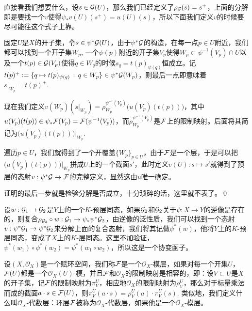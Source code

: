 	直接看我们想要什么，设$s\in \mathcal{G}(U)$，那么我们已经定义了$\rho_{\mathcal{G}}(s)=s^+$，上面的分解即是要找一个$v$使得$\psi_*v(U)(s^+)=u(U)(s)$，所以下面我们定义$v$的时候要尽可能往这个式子上靠。

	固定$U$是$X$的开子集，令$s\in \psi^*\mathcal{G}(U)$，由于$\psi^*\mathcal{G}$的构造，在每一点$p\in U$附近，我们都可以找到一个开子集$W_p$, 一个$\psi(p)$附近的开子集$V_p$使得$W_p\subset \psi^{-1}(V_p)\cap U$以及一个$t(p)\in \mathcal{G}(V_p)$使得$q\in W_q$的时候$s_q=t(p)_{\psi(q)}$恒成立。记$t(p)^+:=\{q\mapsto t(p)_{\psi(q)}\,:\, q\in W_p\}\in \psi^*\mathcal{G}(W_p)$，则最后一点即意味着$s|_{W_p}=t(p)^+$. 

	现在我们定义$v(W_p)(s|_{W_p})=\rho^{\psi^{-1}(V_p)}_{W_p}\bigl(u(V_p)(t(p))\bigr)$，其中$u(V_p)(t(p))\in \psi_*\mathcal{F}(V_p)=\mathcal{F}(\psi^{-1}(V_p))$，而$\rho^{\psi^{-1}(V_p)}_{W_p}$是$\mathcal{F}$上的限制映射。后面将其简记为$\bigl(u(V_p)(t(p))\bigr)|_{W_p}$.

	遍历$p\in U$，我们就得到了一个开覆盖$\{W_p\}_{p\in U}$，由于$\mathcal{F}$是一个层，于是可以把$\bigl(u(V_p)(t(p))\bigr)|_{W_p}$拼成$U$上的一个截面$s'$，此时定义$v(U):s\mapsto s'$就得到了预层的态射$v:\psi^*\mathcal{G} \to \mathcal{F}$的完整定义，显然这由$u$唯一确定。

	证明的最后一步就是检验分解是否成立，十分琐碎的活，这里就不表了。\qed


\para 设$w:\mathcal{G}_1\to \mathcal{G}_2$是$Y$上的一个$K$-预层同态，如果$\mathcal{G}_2$和$\mathcal{G}_2$关于$\psi:X\to Y$的逆像是存在的，则复合$\rho_{\mathcal{G}_2}\circ w:\mathcal{G}_1\to \psi_*\psi^*\mathcal{G}_2$，由逆像的泛性质，我们可以找到一个态射$v:\psi^*\mathcal{G}_1\to \psi^*\mathcal{G}_2$来分解上面的复合态射，我们将其记做$\psi^*(w)$，他将$Y$上的$K$-预层同态，变成了$X$上的$K$-层同态。这里不加验证，$\psi^*(w_1)\circ \psi^*(w_2)=\psi^*(w_1\circ w_2)$，所以这是一个协变函子。

\para 设$(X,\mathcal{O}_X)$是一个赋环空间，我们称$\mathcal{F}$是一个$\mathcal{O}_X$-模层，如果对每一个开集$U$，$\mathcal{F}(U)$都是一个$\mathcal{O}_X(U)$-模，并且$\mathcal{F}$和$\mathcal{O}_X$的限制映射是相容的，即：设$V\subset U$是$X$的开子集，记$\mathcal{F}$的限制映射为$\pi^U_V$，相应地$\mathcal{O}_X$的限制映射为$\rho^U_V$，那么对于标量乘法而成的截面$a\cdot s\in\mathcal{F}(U)$，则$\pi^U_V(a\cdot s)=\rho^U_V(a)\cdot \pi^U_V(s)$.
类似地，我们定义什么叫$\mathcal{O}_X$-代数层：环层$\mathcal{F}$被称为$\mathcal{O}_X$-代数层，如果他是一个$\mathcal{O}_X$-模层。

